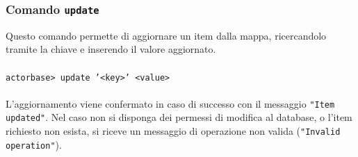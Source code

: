 \documentclass[a4paper]{article}
\begin{document}
	\subsubsection{Comando \texttt{update}}
	Questo comando permette di aggiornare un item dalla mappa, ricercandolo tramite la chiave e inserendo il valore aggiornato.
	\\ \\
	\texttt{actorbase>	update '<key>' <value>}
	\\ \\
	L'aggiornamento viene confermato in caso di successo con il messaggio \texttt{"Item updated"}. Nel caso non si disponga dei permessi di modifica al database, o l'item 
	richiesto non esista, si riceve un messaggio di operazione non valida (\texttt{"Invalid operation"}).
			
	\cleardoublepage
	\listoffigures
	
	\cleardoublepage
	\listoftables
		
\end{document}
